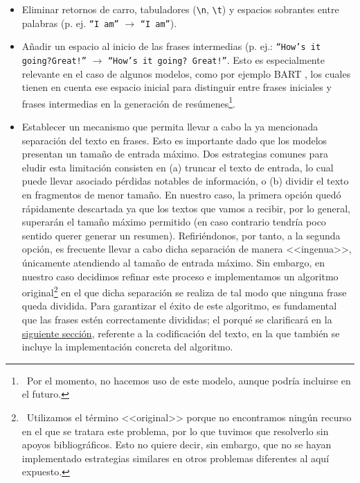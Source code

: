 \begin{itemize}
	\item [\textbullet] Eliminar retornos de carro, tabuladores (\texttt{\textbackslash n}, \texttt{\textbackslash t}) y espacios sobrantes entre palabras (p. ej. \texttt{``I \quad am''} $\rightarrow$ \texttt{``I am''}).
	
	\item [\textbullet] Añadir un espacio al inicio de las frases intermedias (p. ej.: \texttt{``How's it going?Great!''} $\rightarrow$ \texttt{``How's it going? Great!''}. Esto es especialmente relevante en el caso de algunos modelos, como por ejemplo BART \cite{lewis19}, los cuales tienen en cuenta ese espacio inicial para distinguir entre frases iniciales y frases intermedias en la generación de resúmenes\footnote{\, Por el momento, no hacemos uso de este modelo, aunque podría incluirse en el futuro.}.
	
	\item [\textbullet] Establecer un mecanismo que permita llevar a cabo la ya mencionada separación del texto en frases. Esto es importante dado que los modelos presentan un tamaño de entrada máximo. Dos estrategias comunes para eludir esta limitación consisten en (a) truncar el texto de entrada, lo cual puede llevar asociado pérdidas notables de información, o (b) dividir el texto en fragmentos de menor tamaño. En nuestro caso, la primera opción quedó rápidamente descartada ya que los textos que vamos a recibir, por lo general, superarán el tamaño máximo permitido (en caso contrario tendría poco sentido querer generar un resumen). Refiriéndonos, por tanto, a la segunda opción, es frecuente llevar a cabo dicha separación de manera <<ingenua>>, únicamente atendiendo al tamaño de entrada máximo. Sin embargo, en nuestro caso decidimos refinar este proceso e implementamos un algoritmo original\footnote{\, Utilizamos el término <<original>> porque no encontramos ningún recurso en el que se tratara este problema, por lo que tuvimos que resolverlo sin apoyos bibliográficos. Esto no quiere decir, sin embargo, que no se hayan implementado estrategias similares en otros problemas diferentes al aquí expuesto.} en el que dicha separación se realiza de tal modo que ninguna frase queda dividida. Para garantizar el éxito de este algoritmo, es fundamental que las frases estén correctamente divididas; el porqué se clarificará en la \hyperref[sec:codificacion]{siguiente sección}, referente a la codificación del texto, en la que también se incluye la implementación concreta del algoritmo.
\end{itemize}

